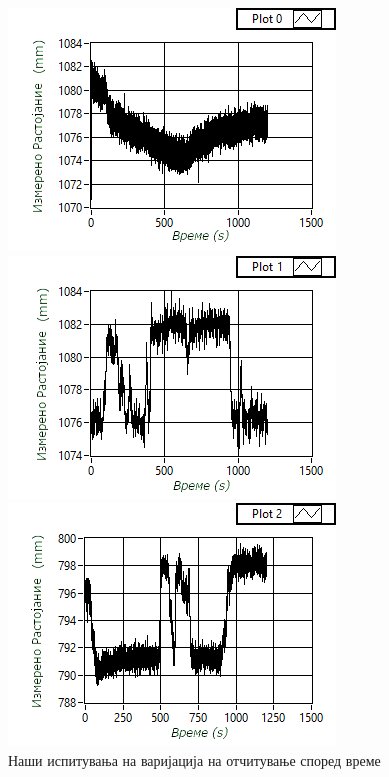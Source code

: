 \documentclass[11pt]{article}
\begin{document}
    \begin{figure}[H]
      \centering
      \begin{minipage}{0.45\linewidth}
        \centering
        \includegraphics[width = \textwidth]{./images/kinect_graph_1_mk.png}
      \end{minipage}
      \begin{minipage}{0.45\linewidth}
          \centering
          \includegraphics[width = \textwidth]{./images/kinect_graph_2_mk.png}
        \end{minipage}
      \includegraphics[width = 0.45\linewidth]{./images/kinect_graph_3_mk.png}
      \caption{Наши испитувања на варијација на отчитување според време}
      \label{fig:kinectgraphs}
      \end{figure}
\end{document}
